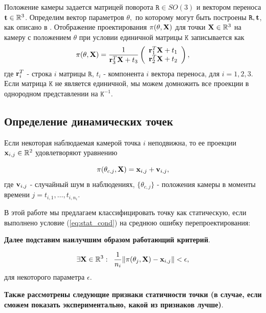 \documentclass[conference]{IEEEtran}
\begin{document}
Положение камеры задается матрицей поворота $\mathtt{R} \in SO(3)$ и вектором переноса ${\bf t} \in \mathbb{R}^3$.  Определим вектор параметров $\theta,$ по которому могут быть построены $\mathtt{R}, {\bf t}$, как описано в \cite{Ziss}. Отображение проектирования $\pi(\theta, {\bf X})$ для точки ${\bf X} \in \mathbb{R}^3$ на камеру с положением $\theta$ при условии единичной матрицы $\mathtt{K}$ записывается как
\begin{equation}\label{eq:proj_fun}
\pi(\theta, {\bf X}) = 
\frac{1}{{\bf r}_3^T {\bf X} + t_3}
\left( 
\begin{array}{c}
 {\bf r}_1^T {\bf X} + t_1 \\
{\bf r}_2^T {\bf X} + t_2
\end{array}
\right),
\end{equation}
где ${\bf r}_i^T$ - строка $i$ матрицы $\mathtt{R}$, $t_i$ - компонента $i$ вектора переноса, для $i = 1,2,3.$ Если матрица $\mathtt{K}$ не является единичной, мы можем домножить все проекции в однородном представлении на $\mathtt{K}^{-1}$.

\subsection{Определение динамических точек}
Если некоторая наблюдаемая камерой точка $i$ неподвижна, то ее проекции ${\bf x}_{i,j} \in \mathbb{R}^2$ удовлетворяют уравнению

\begin{equation}
\label{eq:proj_stat}
\pi(\theta_{c,j}, {\bf X}) = {\bf x}_{i,j} + {\bf v}_{i,j},
\end{equation}
где ${\bf v}_{i,j}$ - случайный шум в наблюдениях, $\{ \theta_{c,j} \}$ - положения камеры в моменты времени $j =t_{i,1}, \ldots, t_{i,n_i}$. 

В этой работе мы предлагаем классифицировать точку как статическую, если выполнено условие (\ref{eq:stat_cond}) на среднюю ошибку перепроектирования:

{\bf Далее подставим наилучшим образом работающий критерий}.

\begin{equation}\label{eq:stat_cond}
\exists {\bf X} \in \mathbb{R}^3: \; \; \frac{1}{n_i} \|\pi(\theta_j, {\bf X}) - {\bf x}_{i,j} \| < \epsilon,
\end{equation}
для некоторого параметра $\epsilon$.

{\bf Также рассмотрены следующие признаки статичности точки (в случае, если сможем показать экспериментально, какой из признаков лучше)}.
\end{document}
